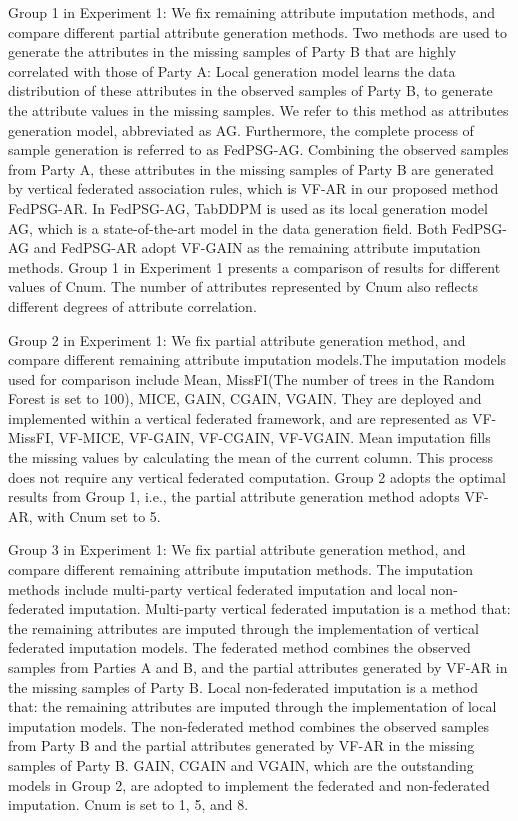 \documentclass[final,1p,times]{elsarticle}
\begin{document}
Group 1 in Experiment 1: We fix remaining attribute imputation methods, and compare different partial attribute generation methods. Two methods are used to generate the attributes in the missing samples of Party B that are highly correlated with those of Party A: Local generation model learns the data distribution of these attributes in the observed samples of Party B, to generate the attribute values in the missing samples. We refer to this method as attributes generation model, abbreviated as AG. Furthermore, the complete process of sample generation is referred to as FedPSG-AG. Combining the observed samples from Party A, these attributes in the missing samples of Party B are generated by vertical federated association rules, which is VF-AR in our proposed method FedPSG-AR. In FedPSG-AG, TabDDPM\cite{17} is used as its local generation model AG, which is a state-of-the-art model in the data generation field. Both FedPSG-AG and FedPSG-AR adopt VF-GAIN as the remaining attribute imputation methods. Group 1 in Experiment 1 presents a comparison of results for different values of Cnum. The number of attributes represented by Cnum also reflects different degrees of attribute correlation.

Group 2 in Experiment 1: We fix partial attribute generation method, and compare different remaining attribute imputation models.The imputation models used for comparison include Mean\cite{18}, MissFI(The number of trees in the Random Forest is set to 100)\cite{21}, MICE\cite{22}, GAIN\cite{24}, CGAIN\cite{25}, VGAIN\cite{27}. They are deployed and implemented within a vertical federated framework, and are represented as VF-MissFI, VF-MICE, VF-GAIN, VF-CGAIN, VF-VGAIN. Mean imputation fills the missing values by calculating the mean of the current column. This process does not require any vertical federated computation. Group 2 adopts the optimal results from Group 1, i.e., the partial attribute generation method adopts VF-AR, with Cnum set to 5.

Group 3 in Experiment 1: We fix partial attribute generation method, and compare different remaining attribute imputation methods. The imputation methods include multi-party vertical federated imputation and local non-federated imputation. Multi-party vertical federated imputation is a method that: the remaining attributes are imputed through the implementation of vertical federated imputation models. The federated method combines the observed samples from Parties A and B, and the partial attributes generated by VF-AR in the missing samples of Party B. Local non-federated imputation is a method that: the remaining attributes are imputed through the implementation of local imputation models. The non-federated method combines the observed samples from Party B and the partial attributes generated by VF-AR in the missing samples of Party B. GAIN, CGAIN and VGAIN, which are the outstanding models in Group 2, are adopted to implement the federated and non-federated imputation. Cnum is set to 1, 5, and 8.
\end{document}
